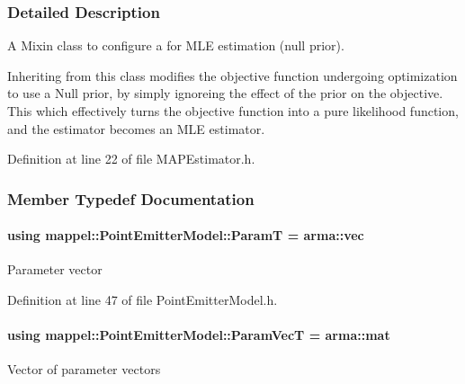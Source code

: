 \subsubsection{Detailed Description}
A Mixin class to configure a for M\+LE estimation (null prior). 

Inheriting from this class modifies the objective function undergoing optimization to use a Null prior, by simply ignoreing the effect of the prior on the objective. This which effectively turns the objective function into a pure likelihood function, and the estimator becomes an M\+LE estimator. 

Definition at line 22 of file M\+A\+P\+Estimator.\+h.



\subsubsection{Member Typedef Documentation}
\paragraph[{\texorpdfstring{ParamT}{ParamT}}]{\setlength{\rightskip}{0pt plus 5cm}using {\bf mappel\+::\+Point\+Emitter\+Model\+::\+ParamT} =  arma\+::vec\hspace{0.3cm}{\ttfamily [inherited]}}\hypertarget{classmappel_1_1PointEmitterModel_a665ec6aea3aac139bb69a23c06d4b9a1}{}\label{classmappel_1_1PointEmitterModel_a665ec6aea3aac139bb69a23c06d4b9a1}
Parameter vector 

Definition at line 47 of file Point\+Emitter\+Model.\+h.

\paragraph[{\texorpdfstring{Param\+VecT}{ParamVecT}}]{\setlength{\rightskip}{0pt plus 5cm}using {\bf mappel\+::\+Point\+Emitter\+Model\+::\+Param\+VecT} =  arma\+::mat\hspace{0.3cm}{\ttfamily [inherited]}}\hypertarget{classmappel_1_1PointEmitterModel_add253b568d763f1513a810aac35de719}{}\label{classmappel_1_1PointEmitterModel_add253b568d763f1513a810aac35de719}
Vector of parameter vectors 

